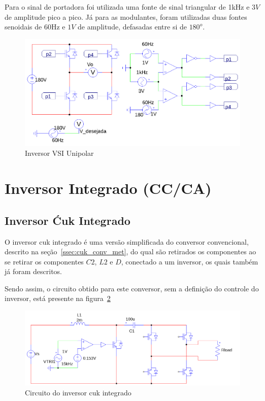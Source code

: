 \documentclass[
	12pt,				%
	openany,
	onseside,
	a4paper,			%
	english,			%
	french,				%
	spanish,			%
	brazil,				%
	]{abntex2}
\begin{document}
Para o sinal de portadora foi utilizada uma fonte de sinal triangular de 1kHz e $3V$ de amplitude pico a pico. Já para as modulantes, foram utilizadas duas fontes senoidais de 60Hz e $1V$ de amplitude, defasadas entre si de $180^o$.
\begin{figure}[H]%
	\centering%
		\includegraphics[width=0.85 \linewidth]{vsi_unipolar_psim_circ}
		\caption{Inversor VSI Unipolar}
		\label{fig:VSI_uni_circ}
\end{figure}

\section{Inversor Integrado (CC/CA)}\label{sec:met_conv_integ}
\subsection{Inversor Ćuk Integrado}

O inversor cuk integrado é uma versão simplificada do conversor convencional, descrito na seção~\ref{ssec:cuk_conv_met}, do qual são retirados os componentes ao se retirar os componentes $C2$, $L2$ e $D$, conectado a um inversor, os quais também já foram descritos.

Sendo assim, o circuito obtido para este conversor, sem a definição do controle do inversor, está presente na figura~\ref{fig:integ_cuk_met}

\begin{figure}[htbp]%
	\begin{center}%
		\includegraphics[width=0.9 \linewidth]{integ_cuk_circ_psim}
		\caption{Circuito do inversor cuk integrado}
		\label{fig:integ_cuk_met}
	\end{center}
\end{figure}
\end{document}
